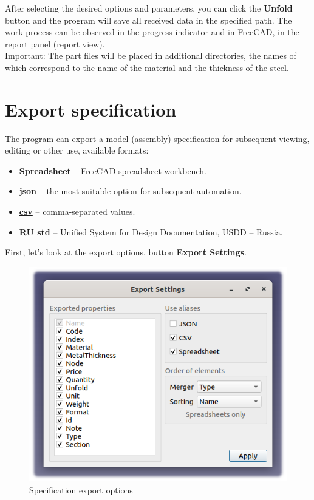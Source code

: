\documentclass[a4paper,12pt]{article}
\begin{document}
\pagebreak

After selecting the desired options and parameters, you can click the \textbf{Unfold} button and the program will save all received data in the specified path. The work process can be observed in the progress indicator and in FreeCAD, in the report panel (report view).\\

Important: The part files will be placed in additional directories, the names of which correspond to the name of the material and the thickness of the steel.




\section{Export specification}

The program can export a model (assembly) specification for subsequent viewing, editing or other use, available formats:
\begin{itemize}
	\item \href{https://wiki.freecad.org/Spreadsheet_Workbench}{\textbf{Spreadsheet}} -- FreeCAD spreadsheet workbench.
	\item \href{https://ru.wikipedia.org/wiki/JSON}{\textbf{json}} -- the most suitable option for subsequent automation.
	\item \href{https://en.wikipedia.org/wiki/Comma-separated_values}{\textbf{csv}} -- comma-separated values.
	\item \textbf{RU std} -- Unified System for Design Documentation, USDD -- Russia.
\end{itemize}

\begin{flushleft}First, let's look at the export options, button \textbf{Export Settings}.\end{flushleft}

\begin{figure}[htp]
	\centering
	\includegraphics[scale=1]{img/specification_export.png}
	\caption{Specification export options}
	\label{sec:specification_export}
\end{figure}
\end{document}
